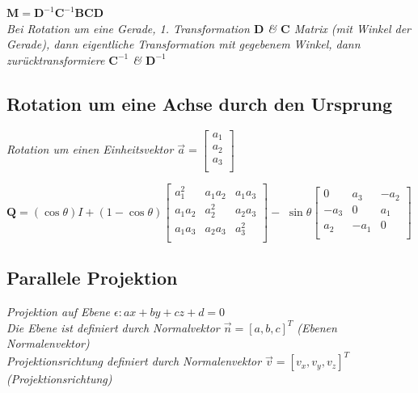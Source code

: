 $\mathbf{M} = \mathbf{D}^{-1}\mathbf{C}^{-1}\mathbf{B}\mathbf{C}\mathbf{D}$
\textit{\\
    Bei Rotation um eine Gerade, 1. Transformation $\mathbf{D}$ \& $\mathbf{C}$
    Matrix (mit Winkel der Gerade), dann eigentliche Transformation mit gegebenem
    Winkel, dann zurücktransformiere $\mathbf{C}^{-1}$ \& $\mathbf{D}^{-1}$
}

\subsection{Rotation um eine Achse durch den Ursprung}

\textit{Rotation um einen Einheitsvektor $\vec{a} = \begin{bmatrix}
    a_1 \\
    a_2 \\
    a_3 \\
\end{bmatrix}$}

$\mathbf{Q} = (\cos \theta)I + (1-\cos \theta) \begin{bmatrix}
    a_1^2 & a_1 a_2 & a_1 a_3 \\
    a_1 a_2 & a_2^2 & a_2 a_3 \\
    a_1 a_3 & a_2 a_3 & a_3^2 \\
\end{bmatrix} -$ $\sin \theta \begin{bmatrix}
    0 & a_3 & -a_2 \\
    -a_3 & 0 & a_1 \\
    a_2 & -a_1 & 0 \\
\end{bmatrix}$

\subsection{Parallele Projektion}

\textit{Projektion auf Ebene $\epsilon: ax + by + cz + d = 0$} \\
\textit{Die Ebene ist definiert durch Normalvektor $\vec{n} = [a, b, c]^T$ (Ebenen Normalenvektor)} \\
\textit{Projektionsrichtung definiert durch Normalenvektor $\vec{v} = [v_x, v_y, v_z]^T$ (Projektionsrichtung)} \\

